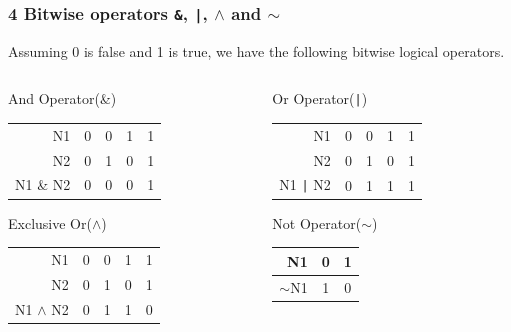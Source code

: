 \documentclass[smaller,handout,table]{beamer}
\begin{document}
\begin{frame}
\frametitle{4 Bitwise operators {\tt \&}, {\tt|}, {\tt$\wedge$} and {\tt$\sim$}}
Assuming 0 is false and 1 is true, we have the following bitwise logical operators.
\begin{columns}
\begin{column}{5cm}
\begin{block}{And Operator(\&)}
\begin{tabular}{r|c c c c}
N1&0&0&1&1\\
N2&0&1&0&1\\
\hline
N1 \& N2&0&0&0&1
\end{tabular}
\end{block}

\begin{block}{Exclusive Or({\tt$\wedge$})}
\begin{tabular}{r|c c c c}
N1&0&0&1&1\\
N2&0&1&0&1\\
\hline
N1 {\tt$\wedge$} N2&0&1&1&0
\end{tabular}
\end{block}

\end{column}
\begin{column}{5cm}
\begin{block}{Or Operator({\tt|})}
\begin{tabular}{r|c c c c}
N1&0&0&1&1\\
N2&0&1&0&1\\
\hline
N1 {\tt|} N2&0&1&1&1
\end{tabular}
\end{block}

\begin{block}{Not Operator({\tt$\sim$})}
\begin{tabular}{r|c c}
N1&0&1\\
\hline
{\tt$\sim$}N1&1&0
\end{tabular}
\end{block}
\vspace{0.13in}
\end{column}
\end{columns}
\end{frame}
\end{document}
